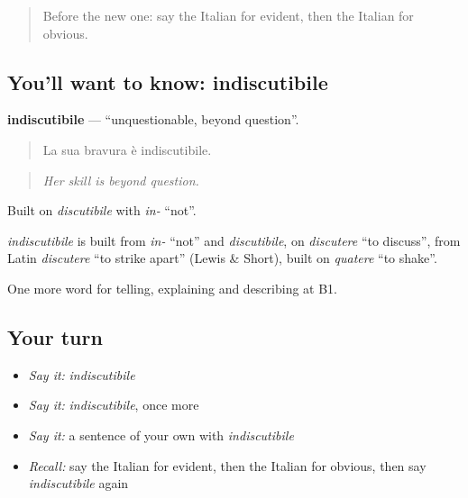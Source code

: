 \begin{quote}
Before the new one: say the Italian for evident, then the Italian for obvious.
\end{quote}

\subsection*{You'll want to know: indiscutibile}
\textbf{indiscutibile} — \textquotedblleft{}unquestionable, beyond question\textquotedblright{}.

\begin{quote}
La sua bravura è indiscutibile.
\end{quote}

\begin{quote}
\emph{Her skill is beyond question.}
\end{quote}

Built on \emph{discutibile} with \emph{in-} \textquotedblleft{}not\textquotedblright{}.

\begin{cousinweb}
\emph{indiscutibile} is built from \emph{in-} \textquotedblleft{}not\textquotedblright{} and \emph{discutibile}, on \emph{discutere} \textquotedblleft{}to discuss\textquotedblright{}, from Latin \emph{discutere} \textquotedblleft{}to strike apart\textquotedblright{} (Lewis \& Short), built on \emph{quatere} \textquotedblleft{}to shake\textquotedblright{}.
\end{cousinweb}

\begin{grammarlens}[title={What you've built}]
One more word for telling, explaining and describing at B1.
\end{grammarlens}

\subsection*{Your turn}
\begin{itemize}
\raggedright
  \item \emph{Say it:} \emph{indiscutibile}
  \item \emph{Say it:} \emph{indiscutibile}, once more
  \item \emph{Say it:} a sentence of your own with \emph{indiscutibile}
  \item \emph{Recall:} say the Italian for evident, then the Italian for obvious, then say \emph{indiscutibile} again
\end{itemize}

